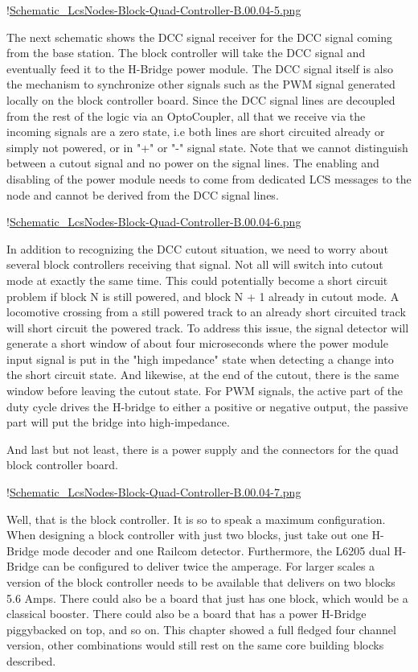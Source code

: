 !\href{./Schematics/Schematic_LcsNodes-Block-Quad-Controller-B.00.04-5.png }{Schematic_LcsNodes-Block-Quad-Controller-B.00.04-5.png}

The next schematic shows the DCC signal receiver for the DCC signal coming from the base station. The block controller will take the DCC signal and eventually feed it to the H-Bridge power module. The DCC signal itself is also the mechanism to synchronize other signals such as the PWM signal generated locally on the block controller board. Since the DCC signal lines are decoupled from the rest of the logic via an OptoCoupler, all that we receive via the incoming signals are a zero state, i.e both lines are short circuited already or simply not powered, or in "+" or "-" signal state. Note that we cannot distinguish between a cutout signal and no power on the signal lines. The enabling and disabling of the power module needs to come from dedicated LCS messages to the node and cannot be derived from the DCC signal lines.

!\href{./Schematics/Schematic_LcsNodes-Block-Quad-Controller-B.00.04-6.png }{Schematic_LcsNodes-Block-Quad-Controller-B.00.04-6.png}

In addition to recognizing the DCC cutout situation, we need to worry about several block controllers receiving that signal. Not all will switch into cutout mode at exactly the same time. This could potentially become a short circuit problem if block N is still powered, and block N + 1 already in cutout mode. A locomotive crossing from a still powered track to an already short circuited track will short circuit the powered track. To address this issue, the signal detector will generate a short window of about four microseconds where the power module input signal is put in the "high impedance" state when detecting a change into the short circuit state. And likewise, at the end of the cutout, there is the same window before leaving the cutout state. For PWM signals, the active part of the duty cycle drives the H-bridge to either a positive or negative output, the passive part will put the bridge into high-impedance.

And last but not least, there is a power supply and the connectors for the quad block controller board.

!\href{./Schematics/Schematic_LcsNodes-Block-Quad-Controller-B.00.04-7.png }{Schematic_LcsNodes-Block-Quad-Controller-B.00.04-7.png}

Well, that is the block controller. It is so to speak a maximum configuration. When designing a block controller with just two blocks, just take out one H-Bridge mode decoder and one Railcom detector. Furthermore, the L6205 dual H-Bridge can be configured to deliver twice the amperage. For larger scales a version of the block controller needs to be available that delivers on two blocks 5.6 Amps. There could also be a board that just has one block, which would be a classical booster. There could also be a board that has a power H-Bridge piggybacked on top, and so on. This chapter showed a full fledged four channel version, other combinations would still rest on the same core building blocks described.

